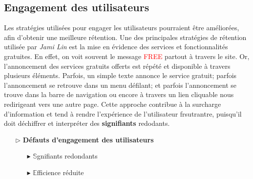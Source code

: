 \documentclass[9pt]{report}
\newcommand{\mathpazott}{\fontfamily{pplj}\selectfont}
\renewcommand{\texttt}[1]{{\scriptsize\mathpazott #1}}
\begin{document}
\begin{multicols*}{2}
  \subsection{Engagement des utilisateurs}
  Les stratégies utilisées pour engager les utilisateurs pourraient 
  être améliorées, afin d'obtenir une meilleure rétention. Une des  
  principales stratégies de rétention utilisée par \textit{Jami Lin} 
  est la mise en évidence des services et fonctionnalités gratuites. 
  En effet, on voit souvent le message \texttt{\textcolor{red}{FREE}} 
  partout à travers le site. Or, l'annoncement des services gratuits 
  offerts est répété et disponible à travers plusieurs éléments. Parfois, 
  un simple texte annonce le service gratuit; parfois l'annoncement 
  se retrouve dans un menu défilant; et parfois l'annoncement se trouve 
  dans la barre de navigation ou encore à travers un lien cliquable nous 
  redirigeant vers une autre page. Cette approche 
  contribue à la surcharge d'information et tend à rendre 
  l'expérience de l'utilisateur frsutrantre, puisqu'il doit 
  déchiffrer et interpréter des \textbf{signifiants}  redodants. 


  \begin{itemize}
    \item [$\rhd$ ] \textbf{Défauts d'engagement des utilisateurs}  
      \begin{itemize}
        \item [$\blacktriangleright$ ] $\mathbb{S}$gnifiants redondants
        \item [$\blacktriangleright$ ] $\mathbb{E}$fficience réduite
      \end{itemize}
  \end{itemize}


\end{multicols*}
\end{document}

